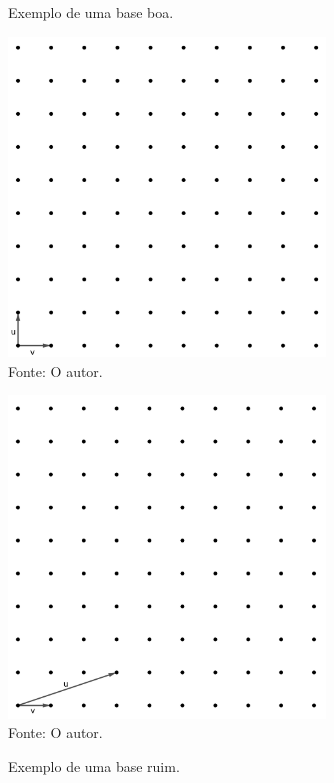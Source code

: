     \begin{figure}[htb!]
        \begin{minipage}[c]{0.5\linewidth}
            \centering
            \caption{Exemplo de uma base boa.}
            \includegraphics[width=0.75\textwidth]{Figuras/base_boa.png}\\
            \footnotesize{Fonte: O autor.}
            \label{fig:base_boa}
        \end{minipage}\hfill
        \begin{minipage}[c]{0.5\linewidth}
            \centering
            \caption{Exemplo de uma base ruim.}
            \includegraphics[width=0.75\textwidth]{Figuras/base_ruim.png}\\
            \footnotesize{Fonte: O autor.}
            \label{fig:base_ruim}
        \end{minipage}
    \end{figure}

